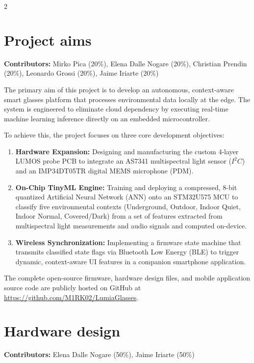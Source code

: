 \documentclass[10pt]{article}
\begin{document}
\begin{multicols}{2}
\section{Project aims}
\noindent\textbf{Contributors:} Mirko Pica (20\%), Elena Dalle Nogare (20\%), Christian Prendin (20\%), Leonardo Grossi (20\%), Jaime Iriarte (20\%)
\vspace{0.1cm}

The primary aim of this project is to develop an autonomous, context-aware smart glasses platform that processes environmental data locally at the edge. The system is engineered to eliminate cloud dependency by executing real-time machine learning inference directly on an embedded microcontroller.

To achieve this, the project focuses on three core development objectives:
\begin{enumerate}
    \item \textbf{Hardware Expansion:} Designing and manufacturing the custom 4-layer LUMOS probe PCB to integrate an AS7341 multispectral light sensor ($I^2C$) and an IMP34DT05TR digital MEMS microphone (PDM).
    \item \textbf{On-Chip TinyML Engine:} Training and deploying a compressed, 8-bit quantized Artificial Neural Network (ANN) onto an STM32U575 MCU to classify five environmental contexts (Underground, Outdoor, Indoor Quiet, Indoor Normal, Covered/Dark) from a set of features extracted from multispectral light measurements and audio signals and computed on-device.
    \item \textbf{Wireless Synchronization:} Implementing a firmware state machine that transmits classified state flags via Bluetooth Low Energy (BLE) to trigger dynamic, context-aware UI features in a companion smartphone application.
\end{enumerate}

The complete open-source firmware, hardware design files, and mobile application source code are publicly hosted on GitHub at \url{https://github.com/M1RK02/LumiaGlasses}.

\section{Hardware design}
\noindent\textbf{Contributors:} Elena Dalle Nogare (50\%), Jaime Iriarte (50\%)
\vspace{0.1cm}


\end{multicols}
\end{document}
